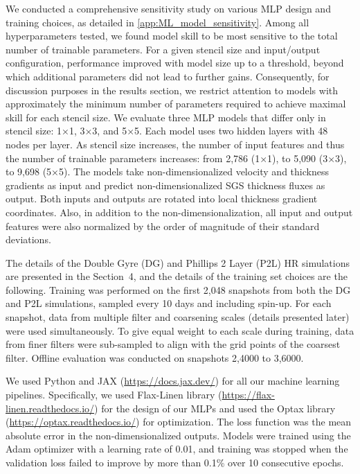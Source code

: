 \documentclass[draft]{agujournal2019}
\begin{document}
We conducted a comprehensive sensitivity study on various MLP design and training choices, as detailed in \ref{app:ML_model_sensitivity}. Among all hyperparameters tested, we found model skill to be most sensitive to the total number of trainable parameters. For a given stencil size and input/output configuration, performance improved with model size up to a threshold, beyond which additional parameters did not lead to further gains. Consequently, for discussion purposes in the results section, we restrict attention to models with approximately the minimum number of parameters required to achieve maximal skill for each stencil size. We evaluate three MLP models that differ only in stencil size: 1×1, 3×3, and 5×5. Each model uses two hidden layers with 48 nodes per layer. As stencil size increases, the number of input features and thus the number of trainable parameters increases: from 2,786 (1×1), to 5,090 (3×3), to 9,698 (5×5).
The models take non-dimensionalized velocity and thickness gradients as input and predict non-dimensionalized SGS thickness fluxes as output. Both inputs and outputs are rotated into local thickness gradient coordinates. Also, in addition to the non-dimensionalization, all input and output features were also normalized by the order of magnitude of their standard deviations.

The details of the Double Gyre (DG) and Phillips 2 Layer (P2L) HR simulations are presented in the Section~4, and the details of the training set choices are the following. Training was performed on the first 2,048 snapshots from both the DG and P2L simulations, sampled every 10 days and including spin-up. For each snapshot, data from multiple filter and coarsening scales (details presented later) were used simultaneously. To give equal weight to each scale during training, data from finer filters were sub-sampled to align with the grid points of the coarsest filter. Offline evaluation was conducted on snapshots 2,4000 to 3,6000. 

We used Python and JAX (\url{https://docs.jax.dev/}) for all our machine learning pipelines. Specifically, we used Flax-Linen library (\url{https://flax-linen.readthedocs.io/}) for the design of our MLPs and used the Optax library (\url{https://optax.readthedocs.io/}) for optimization. The loss function was the mean absolute error in the non-dimensionalized outputs. Models were trained using the Adam optimizer with a learning rate of 0.01, and training was stopped when the validation loss failed to improve by more than 0.1\% over 10 consecutive epochs. 
\end{document}
